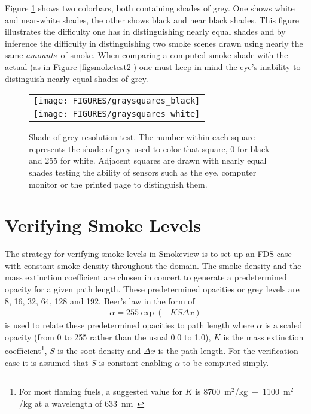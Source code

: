 \documentclass[11pt,twoside]{book}
\newcommand{\figoptions}{hbp}
\begin{document}
Figure \ref{figgraysquare} shows two colorbars, both containing shades of grey.  One shows white and
near-white shades, the other shows black and near black shades.  This figure illustrates the difficulty one has in distinguishing nearly equal shades and by inference the difficulty in distinguishing two smoke scenes drawn using nearly the same {\em amounts}\ of smoke.  When comparing a computed smoke shade with the actual (as in Figure \ref{figsmoketest2}) one must keep in mind the eye's inability to distinguish nearly equal shades of grey.

\begin{figure}[\figoptions]
\begin{center}
 \centering
\begin{tabular}{c}
\texttt{[image: FIGURES/graysquares\_black]}\\
\texttt{[image: FIGURES/graysquares\_white]}\\
 \end{tabular}
\end{center}
 \caption[Shade of grey resolution test.]{Shade of grey resolution test.
 The number within each square represents the shade of grey used to color that square,
 0 for black and 255 for white.  Adjacent squares are drawn with nearly equal shades
 testing the ability of sensors such as the eye, computer monitor or the printed page
 to distinguish them.
 }
\label{figgraysquare}%
\end{figure}

\section{Verifying Smoke Levels}
The strategy for verifying smoke levels in Smokeview is to set up an FDS case with constant smoke density throughout the domain.  The smoke density and the mass extinction coefficient are chosen in concert to generate a predetermined opacity for a given path length.   These predetermined opacities or grey levels are 8, 16, 32, 64, 128 and 192.  Beer's law in the form of
\begin{eqnarray*}
\alpha = 255\exp(-KS\Delta x)
\end{eqnarray*}
is used to relate these predetermined opacities to path length where $\alpha$ is a scaled opacity (from 0 to 255 rather than the usual 0.0 to 1.0),
$K$ is the mass extinction coefficient\footnote{For most flaming fuels, a suggested value for $K$ is
8700~m$^2$/kg~$\pm$~1100~m$^2$/kg at a
wavelength of 633~nm~\cite{Mulholland:F+M}},
$S$ is the soot density and $\Delta x$ is the path length.  For the verification case it is assumed that $S$ is constant enabling $\alpha$ to be computed simply.
\end{document}
